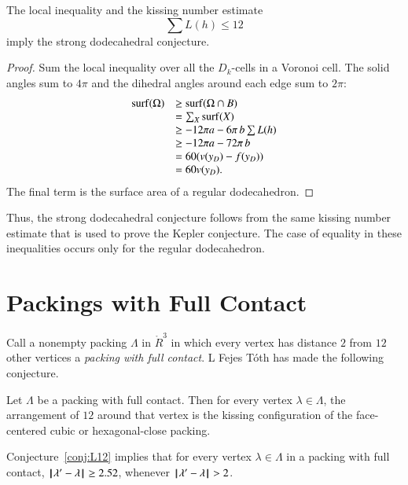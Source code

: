\begin{lemma}  The local inequality and the kissing number estimate
$$
\sum L(h) \le 12
$$
imply the strong dodecahedral conjecture.
\end{lemma}

\begin{proof} 
Sum the local inequality over all the $D_k$-cells in a Voronoi cell.  The solid angles sum to $4\pi$ and the dihedral angles around each edge sum to $2\pi$:
$$
\begin{array}{lll}
{\operatorname{surf}}(\Omega) &\ge {\operatorname{surf}}(\Omega\cap B)\\
&=\sum_X {\operatorname{surf}}(X)\\
&\ge -12\pi a - 6\pi\, b  \sum L(h)\\
&\ge -12\pi a - 72\pi\, b\\
&= 60 (v(y_D) - f(y_D))\\
&= 60 v(y_D).\\
\end{array}
$$
The final term is the surface area of a regular dodecahedron.
\end{proof}

Thus, the strong dodecahedral conjecture follows from the same kissing number estimate that is used to prove the Kepler conjecture.  The case of equality in these inequalities occurs only for the regular dodecahedron.

\section{Packings with Full Contact}



Call a nonempty packing $\Lambda$ in $\ring{R}^3$ in which every vertex has distance $2$ from  $12$ other vertices a {\it packing with full contact}. L Fejes T\'oth has made the following conjecture.

\begin{conjecture}  Let $\Lambda$ be a packing with full contact.  Then for every vertex $\lambda\in\Lambda$, the arrangement of $12$ around that vertex is the kissing configuration of the face-centered cubic or hexagonal-close packing. 
\end{conjecture}

\begin{lemma}  Conjecture~\ref{conj:L12} implies that for every vertex $\lambda\in\Lambda$ in a packing with full contact, ${\hskip0.1em|\hskip-0.15em|\hskip0.1em}\lambda' - \lambda{\hskip0.1em|\hskip-0.15em|\hskip0.1em}\ge 2.52$, whenever ${\hskip0.1em|\hskip-0.15em|\hskip0.1em}\lambda' - \lambda{\hskip0.1em|\hskip-0.15em|\hskip0.1em}> 2$.
\end{lemma}

